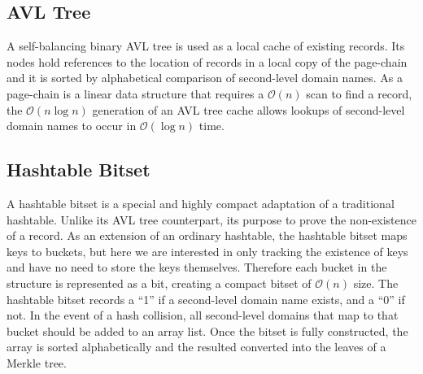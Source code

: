 \subsection{AVL Tree}
\label{sec:AVLTree}

A self-balancing binary AVL tree is used as a local cache of existing records. Its nodes hold references to the location of records in a local copy of the page-chain and it is sorted by alphabetical comparison of second-level domain names. As a page-chain is a linear data structure that requires a $ \mathcal{O}(n) $ scan to find a record, the $ \mathcal{O}(n\log{}n) $ generation of an AVL tree cache allows lookups of second-level domain names to occur in $ \mathcal{O}(\log{}n) $ time.





\subsection{Hashtable Bitset}

A hashtable bitset is a special and highly compact adaptation of a traditional hashtable. Unlike its AVL tree counterpart, its purpose to prove the non-existence of a record. As an extension of an ordinary hashtable, the hashtable bitset maps keys to buckets, but here we are interested in only tracking the existence of keys and have no need to store the keys themselves. Therefore each bucket in the structure is represented as a bit, creating a compact bitset of $ \mathcal{O}(n) $ size. The hashtable bitset records a ``1'' if a second-level domain name exists, and a ``0'' if not. In the event of a hash collision, all second-level domains that map to that bucket should be added to an array list. Once the bitset is fully constructed, the array is sorted alphabetically and the resulted converted into the leaves of a Merkle tree.



